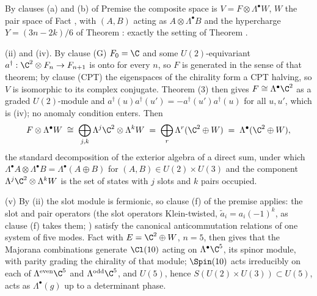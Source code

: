 By clauses (a) and (b) of Premise  the composite space is $V = F \otimes \Lambda^{\bullet}W$, $W$ the pair space of Fact , with $(A, B)$ acting as $A \otimes \Lambda^{\bullet}B$ and the hypercharge $Y = (3n - 2k)/6$ of Theorem : exactly the setting of Theorem .

(ii) and (iv). By clause (G) $F_{0} = \C$ and some $U(2)$-equivariant $a^{\dagger} : \C^{2} \otimes F_{n} \to F_{n+1}$ is onto for every $n$, so $F$ is generated in the sense of that theorem; by clause (CPT) the eigenspaces of the chirality form a CPT halving, so $V$ is isomorphic to its complex conjugate. Theorem (3) then gives $F \cong \Lambda^{\bullet}\C^{2}$ as a graded $U(2)$-module and $a^{\dagger}(u)a^{\dagger}(u') = -a^{\dagger}(u')a^{\dagger}(u)$ for all $u, u'$, which is (iv); no anomaly condition enters. Then
\[
F \otimes \Lambda^{\bullet}W \;\cong\; \bigoplus_{j,k}\Lambda^{j}\C^{2} \otimes \Lambda^{k}W \;=\; \bigoplus_{r}\Lambda^{r}(\C^{2} \oplus W) \;=\; \Lambda^{\bullet}(\C^{2} \oplus W),
\]
the standard decomposition of the exterior algebra of a direct sum, under which $\Lambda^{\bullet}A \otimes \Lambda^{\bullet}B = \Lambda^{\bullet}(A \oplus B)$ for $(A, B) \in U(2) \times U(3)$ and the component $\Lambda^{j}\C^{2} \otimes \Lambda^{k}W$ is the set of states with $j$ slots and $k$ pairs occupied.

(v) By (ii) the slot module is fermionic, so clause (f) of the premise applies: the slot and pair operators (the slot operators Klein-twisted, $\tilde a_{i} = a_{i}(-1)^{k}$, as clause (f) takes them; ) satisfy the canonical anticommutation relations of one system of five modes. Fact  with $E = \C^{2} \oplus W$, $n = 5$, then gives that the Majorana combinations generate $\Cl(10)$ acting on $\Lambda^{\bullet}\C^{5}$, its spinor module, with parity grading the chirality of that module; $\Spin(10)$ acts irreducibly on each of $\Lambda^{\mathrm{even}}\C^{5}$ and $\Lambda^{\mathrm{odd}}\C^{5}$, and $U(5)$, hence $S(U(2) \times U(3)) \subset U(5)$, acts as $\Lambda^{\bullet}(g)$ up to a determinant phase.

